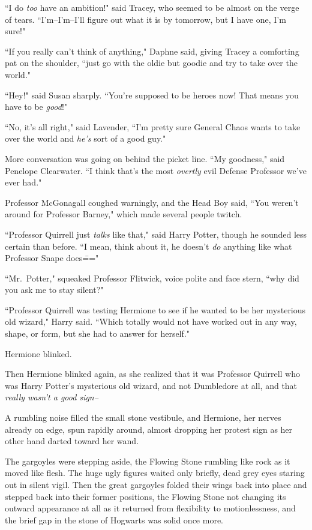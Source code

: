 ``I do \emph{too} have an ambition!" said Tracey, who seemed to be almost on the verge of tears. ``I'm\---I'm\---I'll figure out what it is by tomorrow, but I have one, I'm sure!"

``If you really can't think of anything," Daphne said, giving Tracey a comforting pat on the shoulder, ``just go with the oldie but goodie and try to take over the world."

``Hey!" said Susan sharply. ``You're supposed to be heroes now! That means you have to be \emph{good}!"

``No, it's all right," said Lavender, ``I'm pretty sure General Chaos wants to take over the world and \emph{he's} sort of a good guy."

More conversation was going on behind the picket line. ``My goodness," said Penelope Clearwater. ``I think that's the most \emph{overtly} evil Defense Professor we've ever had."

Professor McGonagall coughed warningly, and the Head Boy said, ``You weren't around for Professor Barney," which made several people twitch.

``Professor Quirrell just \emph{talks} like that," said Harry Potter, though he sounded less certain than before. ``I mean, think about it, he doesn't \emph{do} anything like what Professor Snape does\==="

``Mr.~Potter," squeaked Professor Flitwick, voice polite and face stern, ``why did you ask me to stay silent?"

``Professor Quirrell was testing Hermione to see if he wanted to be her mysterious old wizard," Harry said. ``Which totally would not have worked out in any way, shape, or form, but she had to answer for herself."

Hermione blinked.

Then Hermione blinked again, as she realized that it was Professor Quirrell who was Harry Potter's mysterious old wizard, and not Dumbledore at all, and that \emph{really wasn't a good sign\---}

A rumbling noise filled the small stone vestibule, and Hermione, her nerves already on edge, spun rapidly around, almost dropping her protest sign as her other hand darted toward her wand.

The gargoyles were stepping aside, the Flowing Stone rumbling like rock as it moved like flesh. The huge ugly figures waited only briefly, dead grey eyes staring out in silent vigil. Then the great gargoyles folded their wings back into place and stepped back into their former positions, the Flowing Stone not changing its outward appearance at all as it returned from flexibility to motionlessness, and the brief gap in the stone of Hogwarts was solid once more.

